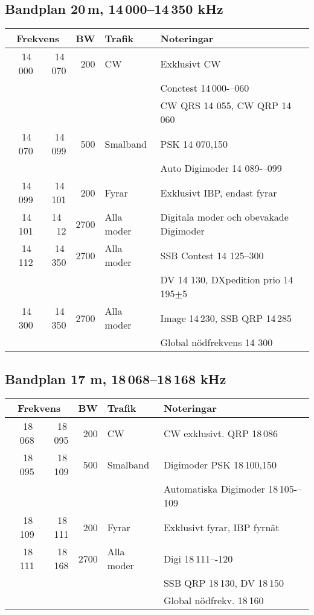 \subsection{Bandplan 20\,m, 14\,000--14\,350 kHz}
\begin{tabular}{rrrll}
\multicolumn{2}{c}{\textbf{Frekvens}} & \textbf{BW} & \textbf{Trafik} & \textbf{Noteringar} \\ \hline
14\,000 & 14\,070 & 200  & CW         & Exklusivt CW                             \\
        &         &      &            & Conctest 14\,000-–060                    \\
        &         &      &            & CW QRS 14 055, CW QRP 14\,060            \\ \hline
14\,070 & 14\,099 & 500  & Smalband   & PSK 14 070,150                           \\
        &         &      &            & Auto Digimoder 14 089-–099               \\ \hline
14\,099 & 14\,101 & 200  & Fyrar      & Exklusivt IBP, endast fyrar              \\ \hline
14\,101 & 14 \,12 & 2700 & Alla moder & Digitala moder och obevakade Digimoder   \\ \hline
14\,112 & 14\,350 & 2700 & Alla moder & SSB Contest 14 125--300                  \\
        &         &      &            & DV 14 130, DXpedition prio 14\,195$\pm$5 \\ \hline
14\,300 & 14\,350 & 2700 & Alla moder & Image 14\,230, SSB QRP 14\,285           \\
        &         &      &            & Global nödfrekvens 14 300                \\ \hline
\end{tabular}

\subsection{Bandplan 17 m, 18\,068--18\,168 kHz}
\begin{tabular}{rrrll}
\multicolumn{2}{c}{\textbf{Frekvens}} & \textbf{BW} & \textbf{Trafik} & \textbf{Noteringar} \\ \hline

18\,068 & 18\,095 & 200  & CW         & CW exklusivt. QRP 18\,086             \\ \hline
18\,095 & 18\,109 & 500  & Smalband   & Digimoder PSK 18\,100,150             \\
        &         &      &            & Automatiska Digimoder 18\,105-–109 \\ \hline
18\,109 & 18\,111 & 200  & Fyrar      & Exklusivt fyrar, IBP fyrnät           \\ \hline
18\,111 & 18\,168 & 2700 & Alla moder & Digi 18\,111–-120                   \\
        &         &      &            & SSB QRP 18\,130, DV 18\,150           \\
        &         &      &            & Global nödfrekv. 18\,160              \\ \hline
\end{tabular}

